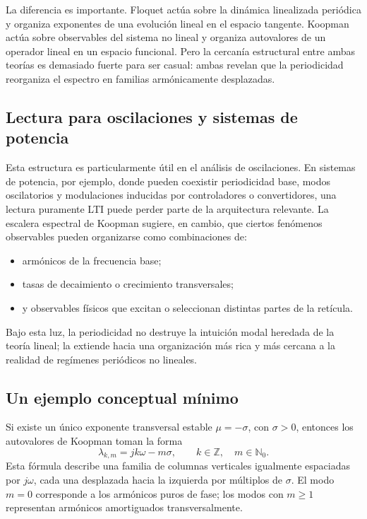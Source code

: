 La diferencia es importante. Floquet actúa sobre la dinámica linealizada periódica y organiza exponentes de una evolución lineal en el espacio tangente. Koopman actúa sobre observables del sistema no lineal y organiza autovalores de un operador lineal en un espacio funcional. Pero la cercanía estructural entre ambas teorías es demasiado fuerte para ser casual: ambas revelan que la periodicidad reorganiza el espectro en familias armónicamente desplazadas.

\subsection{Lectura para oscilaciones y sistemas de potencia}

Esta estructura es particularmente útil en el análisis de oscilaciones. En sistemas de potencia, por ejemplo, donde pueden coexistir periodicidad base, modos oscilatorios y modulaciones inducidas por controladores o convertidores, una lectura puramente LTI puede perder parte de la arquitectura relevante. La escalera espectral de Koopman sugiere, en cambio, que ciertos fenómenos observables pueden organizarse como combinaciones de:
\begin{itemize}
\item armónicos de la frecuencia base;
\item tasas de decaimiento o crecimiento transversales;
\item y observables físicos que excitan o seleccionan distintas partes de la retícula.
\end{itemize}

Bajo esta luz, la periodicidad no destruye la intuición modal heredada de la teoría lineal; la extiende hacia una organización más rica y más cercana a la realidad de regímenes periódicos no lineales.

\subsection{Un ejemplo conceptual mínimo}

Si existe un único exponente transversal estable \(\mu=-\sigma\), con \(\sigma>0\), entonces los autovalores de Koopman toman la forma
\begin{equation}
\lambda_{k,m}=jk\omega-m\sigma,
\qquad
k\in\mathbb{Z},\quad m\in\mathbb{N}_0.
\label{eq:Koopman_ladder_stable_example}
\end{equation}
Esta fórmula describe una familia de columnas verticales igualmente espaciadas por \(j\omega\), cada una desplazada hacia la izquierda por múltiplos de \(\sigma\). El modo \(m=0\) corresponde a los armónicos puros de fase; los modos con \(m\ge 1\) representan armónicos amortiguados transversalmente.

